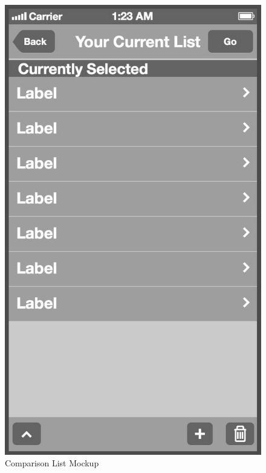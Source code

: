 \\
\begin{figure}[ptb]
    \begin{minipage}[b]{0.45\linewidth}
        \centering
        \includegraphics[width=0.8025\linewidth]{figures/Screen_2_bw.jpg}
        \caption[Comparison List Screen Mockup]{Comparison List Mockup}
        \label{fig:CurrentListScreen}
    \end{minipage}
    \hspace{0.5cm}
    \begin{minipage}[b]{0.45\linewidth}
        \centering

\end{minipage}
\end{figure}
